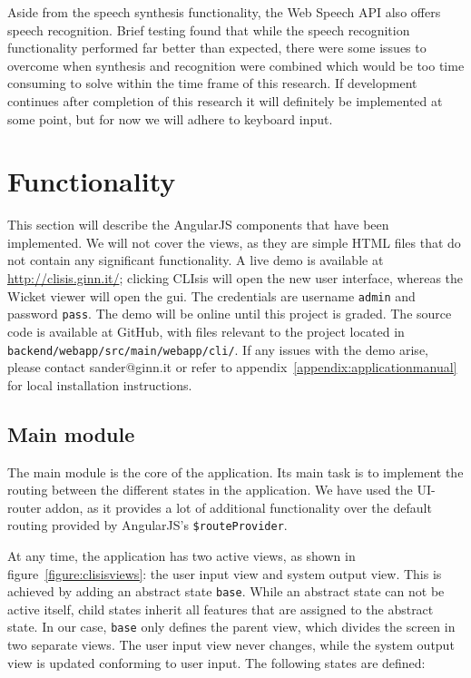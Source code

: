 Aside from the speech synthesis functionality, the Web Speech API also offers speech recognition. Brief testing found that while the speech recognition functionality performed far better than expected, there were some issues to overcome when synthesis and recognition were combined which would be too time consuming to solve within the time frame of this research. If development continues after completion of this research it will definitely be implemented at some point, but for now we will adhere to keyboard input.

\section{Functionality}
\label{section:functionality}
This section will describe the AngularJS components that have been implemented. We will not cover the views, as they are simple HTML files that do not contain any significant functionality. A live demo is available at \url{http://clisis.ginn.it/}; clicking CLIsis will open the new user interface, whereas the Wicket viewer will open the \acrshort{gui}. The credentials are username \texttt{admin} and password \texttt{pass}. The demo will be online until this project is graded.  The source code is available at GitHub\cite{sande54:online}, with files relevant to the project located in \texttt{backend/webapp/src/main/webapp/cli/}. If any issues with the demo arise, please contact sander@ginn.it or refer to appendix~\ref{appendix:applicationmanual} for local installation instructions.

\subsection{Main module}
\label{subsection:mainmodule}
The main module  is the core of the application. Its main task is to implement the routing between the different states in the application. We have used the UI-router addon\cite{angul39:online}, as it provides a lot of additional functionality over the default routing provided by AngularJS's \texttt{\$routeProvider}. 

At any time, the application has two active views, as shown in figure~\ref{figure:clisisviews}: the user input view and system output view. This is achieved by adding an abstract state \texttt{base}. While an abstract state can not be active itself, child states inherit all features that are assigned to the abstract state. In our case, \texttt{base} only defines the parent view, which divides the screen in two separate views. The user input view never changes, while the system output view is updated conforming to user input. The following states are defined:

